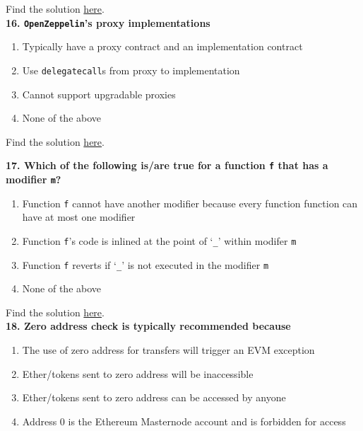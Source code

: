 Find the solution \hyperref[sec:exam3_q15]{here}.\\

\textbf{16. \texttt{OpenZeppelin}'s proxy implementations}

\begin{enumerate}[label=\Alph*.]
    \item Typically have a proxy contract and an implementation contract
    \item Use \verb|delegatecall|s from proxy to implementation
    \item Cannot support upgradable proxies
    \item None of the above
\end{enumerate}

Find the solution \hyperref[sec:exam3_q16]{here}.\\

\pagebreak

\textbf{17. Which of the following is/are true for a function \texttt{f} that has a modifier \texttt{m}?}

\begin{enumerate}[label=\Alph*.]
    \item Function \verb|f| cannot have another modifier because every function function can have at most one modifier
    \item Function \verb|f|'s code is inlined at the point of `\verb|_|' within modifer \verb|m|
    \item Function \verb|f| reverts if `\verb|_|' is not executed in the modifier \verb|m|
    \item None of the above
\end{enumerate}

Find the solution \hyperref[sec:exam3_q17]{here}.\\

\textbf{18. Zero address check is typically recommended because}

\begin{enumerate}[label=\Alph*.]
    \item The use of zero address for transfers will trigger an EVM exception
    \item Ether/tokens sent to zero address will be inaccessible
    \item Ether/tokens sent to zero address can be accessed by anyone
    \item Address 0 is the Ethereum Masternode account and is forbidden for access
\end{enumerate}

